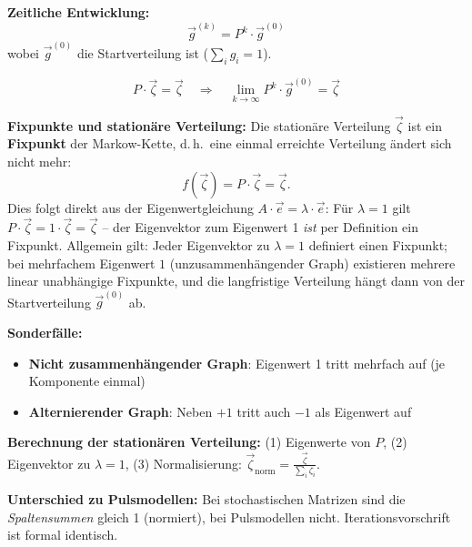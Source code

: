 

\textbf{Zeitliche Entwicklung:}
\[
\vec{g}^{(k)} = P^k \cdot \vec{g}^{(0)}
\]
wobei $\vec{g}^{(0)}$ die Startverteilung ist ($\sum_i g_i = 1$).

\[
P \cdot \vec{\zeta} = \vec{\zeta} \quad \Rightarrow \quad \lim_{k \to \infty} P^k \cdot \vec{g}^{(0)} = \vec{\zeta}
\]

\textbf{Fixpunkte und stationäre Verteilung:} Die stationäre Verteilung $\vec{\zeta}$ ist ein \textbf{Fixpunkt} der Markow-Kette, d.\,h.\ eine einmal erreichte Verteilung ändert sich nicht mehr:
\[
f(\vec{\zeta}) = P \cdot \vec{\zeta} = \vec{\zeta}.
\]
Dies folgt direkt aus der Eigenwertgleichung $A \cdot \vec{e} = \lambda \cdot \vec{e}$: Für $\lambda = 1$ gilt $P \cdot \vec{\zeta} = 1 \cdot \vec{\zeta} = \vec{\zeta}$ -- der Eigenvektor zum Eigenwert 1 \emph{ist} per Definition ein Fixpunkt. Allgemein gilt: Jeder Eigenvektor zu $\lambda = 1$ definiert einen Fixpunkt; bei mehrfachem Eigenwert $1$ (unzusammenhängender Graph) existieren mehrere linear unabhängige Fixpunkte, und die langfristige Verteilung hängt dann von der Startverteilung $\vec{g}^{(0)}$ ab.

\textbf{Sonderfälle:}
\begin{itemize}[leftmargin=1.5em]
    \item \textbf{Nicht zusammenhängender Graph}: Eigenwert 1 tritt mehrfach auf (je Komponente einmal)
    \item \textbf{Alternierender Graph}: Neben $+1$ tritt auch $-1$ als Eigenwert auf
\end{itemize}

\textbf{Berechnung der stationären Verteilung:} (1) Eigenwerte von $P$, (2) Eigenvektor zu $\lambda = 1$, (3) Normalisierung: $\vec{\zeta}_{\mathrm{norm}} = \frac{\vec{\zeta}}{\sum_i \zeta_i}$.

\textbf{Unterschied zu Pulsmodellen:} Bei stochastischen Matrizen sind die \emph{Spaltensummen} gleich 1 (normiert), bei Pulsmodellen nicht. Iterationsvorschrift ist formal identisch.

